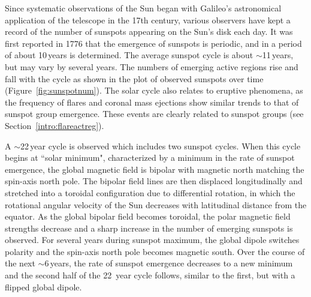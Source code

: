
Since systematic observations of the Sun began with Galileo's astronomical application of the telescope in the 17th century, various observers have kept a record of the number of sunspots appearing on the Sun's disk each day. It was first reported in 1776 that the emergence of sunspots is periodic, and in \cite{Schwabe:1844} a period of about 10\,years is determined. The average sunspot cycle is about $\sim$11\,years, but may vary by several years. The numbers of emerging active regions rise and fall with the cycle as shown in the plot of observed sunspots over time (Figure~\ref{fig:sunspotnum}).
The solar cycle also relates to eruptive phenomena, as the frequency of flares and coronal mass ejections show similar trends to that of sunspot group emergence. These events are clearly related to sunspot groups (see Section~\ref{intro:flareactreg}).


A $\sim$22\,year cycle is observed which includes two sunspot cycles. When this cycle begins at ``solar minimum", characterized by a minimum in the rate of sunspot emergence,  the global magnetic field is bipolar with magnetic north matching the spin-axis north pole. The bipolar field lines are then displaced longitudinally and stretched into a toroidal configuration due to differential rotation, in which the rotational angular velocity of the Sun decreases with latitudinal distance from the equator. As the global bipolar field becomes toroidal, the polar magnetic field strengths decrease and a sharp increase in the number of emerging sunspots is observed. For several years during sunspot maximum, the global dipole switches polarity and the spin-axis north pole becomes magnetic south. Over the course of the next $\sim$6\,years, the rate of sunspot emergence decreases to a new minimum and the second half of the 22~year cycle follows, similar to the first, but with a flipped global dipole. 

